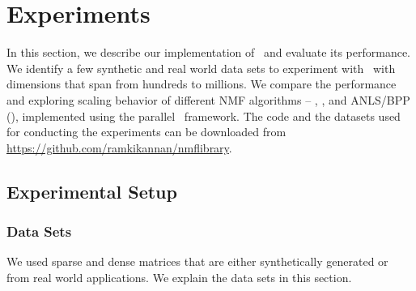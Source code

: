 \section{Experiments}
\label{sec:experiment}
\newcommand{\NLS}{LUC }

In this section, we describe our implementation of \ParNMF\ and evaluate its performance.
We identify a few synthetic and real world data sets to experiment with \ParNMF\ with dimensions that span from hundreds to millions. 
We compare the performance and exploring scaling behavior of different NMF algorithms -- \MU, \HALS, and ANLS/BPP (\BPP), implemented using the parallel \ParNMF\ framework.  
The code and the  datasets used for conducting the experiments can be downloaded from \url{https://github.com/ramkikannan/nmflibrary}. 

\subsection{Experimental Setup}

\subsubsection{Data Sets}\label{sec:datasets}

We used sparse and dense matrices that are either synthetically generated or from real world applications. We explain the data sets in this section.

